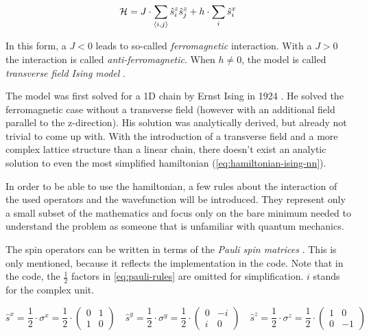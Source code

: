 \begin{equation}
    \label{eq:hamiltonian-ising-nn}
    \mathcal{H} =  J \cdot \sum\limits_{\langle i, j \rangle} \hat{s}^z_i \hat{s}^z_j + h \cdot \sum\limits_{i} \hat{s}^x_i
\end{equation}

In this form, a $J < 0$ leads to so-called \emph{ferromagnetic} interaction. With a $J > 0$ the interaction is called \emph{anti-ferromagnetic}. When $h \neq 0$, the model is called \emph{transverse field Ising model} \cite{isingBook}.

The model was first solved for a 1D chain by Ernst Ising in 1924 \cite*[]{isingFerromagnetismn}. He solved the ferromagnetic case without a transverse field (however with an additional field parallel to the z-direction). His solution was analytically derived, but already not trivial to come up with.
With the introduction of a transverse field and a more complex lattice structure than a linear chain, there doesn't exist an analytic solution to even the most simplified hamiltonian (\autoref{eq:hamiltonian-ising-nn}).

In order to be able to use the hamiltonian, a few rules about the interaction of the used operators and the wavefunction will be introduced. They represent only a small subset of the mathematics and focus only on the bare minimum needed to understand the problem as someone that is unfamiliar with quantum mechanics. 

The spin operators can be written in terms of the \emph{Pauli spin matrices} \cite{schwablQM}. This is only mentioned, because it reflects the implementation in the code. Note that in the code, the $\frac{1}{2}$ factors in \autoref{eq:pauli-rules} are omitted for simplification. $i$ stands for the complex unit.

\begin{equation}
    \label{eq:pauli-rules}
    \hat{s}^x = \frac{1}{2} \cdot \sigma^x = \frac{1}{2} \cdot \left(\begin{matrix}
        0& 1 \\
        1& 0
    \end{matrix}\right) \quad
    \hat{s}^y = \frac{1}{2} \cdot \sigma^y = \frac{1}{2} \cdot \left(\begin{matrix}
        0& -i \\
        i& 0
    \end{matrix}\right) \quad
    \hat{s}^z = \frac{1}{2} \cdot \sigma^z = \frac{1}{2} \cdot \left(\begin{matrix}
        1& 0 \\
        0& -1
    \end{matrix}\right)
\end{equation}

